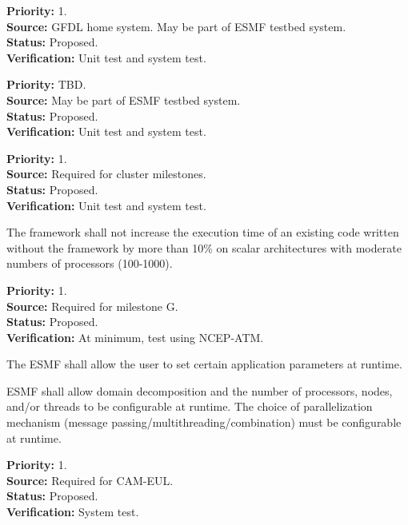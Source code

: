 \begin{reqlist}
{\bf Priority:} 1. \\
{\bf Source:} GFDL home system.  May be part of ESMF testbed system. \\
{\bf Status:} Proposed. \\
{\bf Verification:} Unit test and system test.
\end{reqlist}

\begin{reqlist}
{\bf Priority:} TBD. \\
{\bf Source:} May be part of ESMF testbed system. \\
{\bf Status:} Proposed. \\
{\bf Verification:} Unit test and system test.
\end{reqlist}

\begin{reqlist}
{\bf Priority:} 1. \\
{\bf Source:} Required for cluster milestones. \\
{\bf Status:} Proposed. \\
{\bf Verification:} Unit test and system test.
\end{reqlist}

The framework shall not increase the execution time of an existing code 
written without the framework by more than 10\% on scalar 
architectures with moderate numbers of processors (100-1000).
\begin{reqlist}
{\bf Priority:} 1. \\
{\bf Source:} Required for milestone G. \\
{\bf Status:} Proposed. \\
{\bf Verification:} At minimum, test using NCEP-ATM.
\end{reqlist}

The ESMF shall allow the user to set certain application parameters at runtime.

ESMF shall allow domain decomposition and the number of processors, 
nodes, and/or threads to be configurable at runtime.  The choice of
parallelization mechanism (message passing/multithreading/combination)
must be configurable at runtime.
\begin{reqlist}
{\bf Priority:} 1. \\
{\bf Source:} Required for CAM-EUL. \\
{\bf Status:} Proposed. \\
{\bf Verification:} System test.
\end{reqlist}

